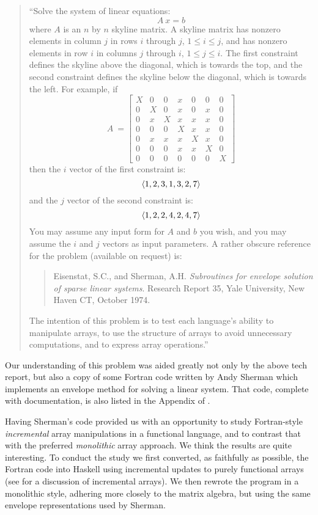 \begin{quotation}
``Solve the system of linear equations:
\[ A\ x = b \]
where $A$ is an $n$ by $n$ skyline matrix.  A skyline matrix has
nonzero elements in column $j$ in rows $i$ through $j$, $1 \leq i \leq
j$, and has nonzero elements in row $i$ in columns $j$ through $i$, $1
\leq j \leq i$.  The first constraint defines the skyline above the
diagonal, which is towards the top, and the second constraint defines
the skyline below the diagonal, which is towards the left.  For
example, if
\[ A\ = \left[
       \begin{array}{ccccccc}
       X & 0 & 0 & x & 0 & 0 & 0 \\
       0 & X & 0 & x & 0 & x & 0 \\
       0 & x & X & x & x & x & 0 \\
       0 & 0 & 0 & X & x & x & 0 \\
       0 & x & x & x & X & x & 0 \\
       0 & 0 & 0 & x & x & X & 0 \\
       0 & 0 & 0 & 0 & 0 & 0 & X 

       \end{array}
       \right]
\]
then the $i$ vector of the first constraint is:
\[ \langle1,2,3,1,3,2,7\rangle \]
and the $j$ vector of the second constraint is:
\[ \langle1,2,2,4,2,4,7\rangle \]
You may assume any input form for $A$ and $b$ you wish, and you may
assume the $i$ and $j$ vectors as input parameters.  A rather obscure
reference for the problem (available on request) is:
\begin{quotation}
Eisenstat, S.C., and Sherman, A.H. {\em Subroutines for envelope solution  
of 
sparse linear systems}.  Research Report 35, Yale University, New Haven  
CT, 
October 1974.
\end{quotation}
The intention of this problem is to test each language's ability to
manipulate arrays, to use the structure of arrays to avoid unnecessary
computations, and to express array operations.''
\end{quotation}

Our understanding of this problem was aided greatly not only by the
above tech report, but also a copy of some Fortran code written by
Andy Sherman which implements an envelope method for solving a linear
system.  That code, complete with documentation, is also listed in the
Appendix of \cite{huda88f}.

Having Sherman's code provided us with an opportunity to study
Fortran-style {\em incremental} array manipulations in a functional
language, and to contrast that with the preferred {\em monolithic}
array approach.  We think the results are quite interesting.  To
conduct the study we first converted, as faithfully as possible, the
Fortran code into Haskell using incremental updates to purely
functional arrays (see \cite{huda87b} for a discussion of incremental
arrays).  We then rewrote the program in a monolithic style, adhering
more closely to the matrix algebra, but using the same envelope
representations used by Sherman.

